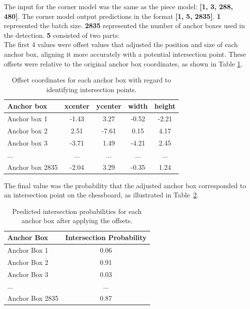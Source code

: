 The input for the corner model was the same as the piece model: \textbf{[1, 3, 288, 480]}. The corner model output predictions in the format \textbf{[1, 5, 2835]}. \textbf{1} represented the batch size. \textbf{2835} represented the number of anchor boxes used in the detection. \textbf{5} consisted of two parts: \\

The first 4 values were offset values that adjusted the position and size of each anchor box, aligning it more accurately with a potential intersection point. These offsets were relative to the original anchor box coordinates, as shown in Table \ref{tab:corner-offset-table}.


\begin{table}[h]
    \centering
    \caption{Offset coordinates for each anchor box with regard to identifying intersection points.}  %
    \renewcommand{\arraystretch}{1.5} %
    \begin{tabular}{lcccc}
        \toprule
        \textbf{Anchor box} & \textbf{xcenter} & \textbf{ycenter} & \textbf{width} & \textbf{height} \\
        \midrule
        Anchor box 1 & -1.43 & 3.27 & -0.52 & -2.21 \\
        Anchor box 2 & 2.51 & -7.61 & 0.15 & 4.17 \\
        Anchor box 3 & -3.71 & 1.49 & -4.21 & 2.45 \\
        ... & ... & ... & ... & ... \\
        Anchor box 2835 & -2.04 & 3.29 & -0.35 & 1.24 \\
        \bottomrule
    \end{tabular}
    \label{tab:corner-offset-table}
\end{table}

The final value was the probability that the adjusted anchor box corresponded to an intersection point on the chessboard, as illustrated in Table~\ref{tab:corner-probability-table}. \\

\begin{table}[h]
    \centering
    \caption{Predicted intersection probabilities for each anchor box after applying the offsets.}
    \renewcommand{\arraystretch}{1.5}
    \begin{tabular}{lc}
        \toprule
        \textbf{Anchor Box} & \textbf{Intersection Probability} \\
        \midrule
        Anchor Box 1 & 0.06 \\
        Anchor Box 2 & 0.91 \\
        Anchor Box 3 & 0.03 \\
        ... & ... \\
        Anchor Box 2835 & 0.87 \\
        \bottomrule
    \end{tabular}
    \label{tab:corner-probability-table}
\end{table}


